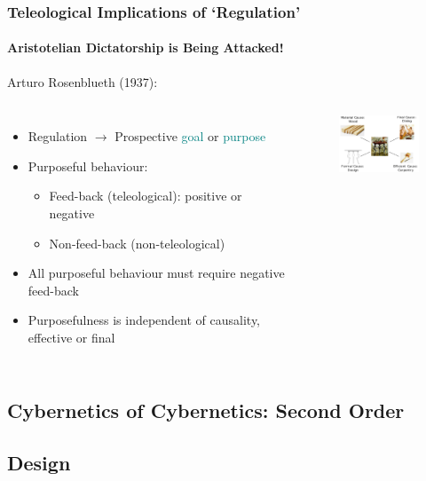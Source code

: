 		\begin{frame}
    		\frametitle{Teleological Implications of `Regulation'}
    		\framesubtitle{Aristotelian Dictatorship is Being Attacked!}
    		Arturo Rosenblueth (1937):\\
    		\begin{columns}
    		        \begin{itemize}
    		            \item<1->Regulation $\longrightarrow$ Prospective \textcolor{teal}{goal} or \textcolor{teal}{purpose}
    		            \item<2->Purposeful behaviour:
    		                \begin{itemize}
    		                    \item Feed-back (teleological): positive or negative
    		                    \item Non-feed-back (non-teleological)
    		                \end{itemize}
		                \item<3->All purposeful behaviour must require negative feed-back
		                \item<4->Purposefulness is independent of causality, effective or final
    		        \end{itemize}
    		        \begin{figure}
					    \includegraphics[width=3cm]{./resources/4cause.png}
				    \end{figure}
    		\end{columns}
		\end{frame}
	\subsection{Cybernetics of Cybernetics: Second Order}
		\begin{frame}
		\end{frame}
	\subsection{Design}